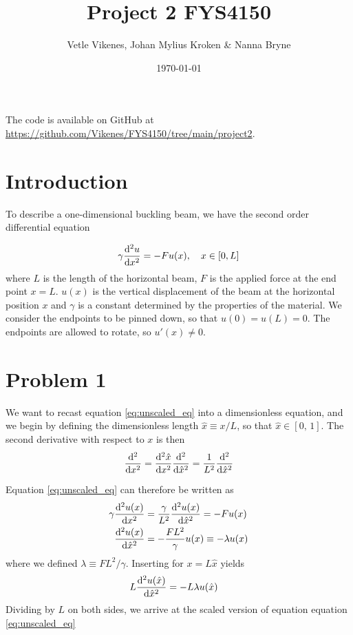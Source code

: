 \documentclass[english,notitlepage,nofootinbib]{revtex4-1}  %
\begin{document}
\title{Project 2 FYS4150}      %
\author{Vetle Vikenes, Johan Mylius Kroken \& Nanna Bryne}          %
\date{\today}                             %
\noaffiliation                            %


\maketitle 
    
The code is available on GitHub at \url{https://github.com/Vikenes/FYS4150/tree/main/project2}.
    

\section*{Introduction}

To describe a one-dimensional buckling beam, we have the second order differential equation 

\begin{align}\label{eq:unscaled_eq}
    \gamma \dv[2]{u}{x} = -F u(x), \quad x\in [0,L]
\end{align}
where $L$ is the length of the horizontal beam, $F$ is the applied force at the end point $x=L$. $u(x)$ is the vertical displacement of the beam at the horizontal position $x$ and $\gamma$ is a constant determined by the properties of the material. We consider the endpoints to be pinned down, so that $u(0)=u(L)=0$. The endpoints are allowed to rotate, so $u'(x)\neq0$.

\section*{Problem 1}

We want to recast equation \eqref{eq:unscaled_eq} into a dimensionless equation, and we begin by defining the dimensionless length $\hat{x}\equiv x/L$, so that $\hat{x}\in[0,\,1]$. The second derivative with respect to $x$ is then 
\begin{align*}
    \dv[2]{x} = \dv[2]{\hat{x}}{x}\dv[2]{\hat{x}}=\frac{1}{L^2} \dv[2]{\hat{x}}
\end{align*}  

Equation \eqref{eq:unscaled_eq} can therefore be written as 
\begin{align*}
    \gamma \dv[2]{u(x)}{x} &= \frac{\gamma}{L^2}\dv[2]{u(x)}{\hat{x}} = -F u(x) \\ 
    \dv[2]{u(x)}{\hat{x}} &= - \frac{FL^2}{\gamma} u(x) \equiv -\lambda u(x)
\end{align*}
where we defined $\lambda\equiv F L ^2 / \gamma$. Inserting for $x=L\hat{x}$ yields 
\begin{align*}
    L \dv[2]{u(\hat{x})}{\hat{x}} &= -L \lambda u(\hat{x}) 
\end{align*}
Dividing by $L$ on both sides, we arrive at the scaled version of equation equation \eqref{eq:unscaled_eq}
\end{document}
